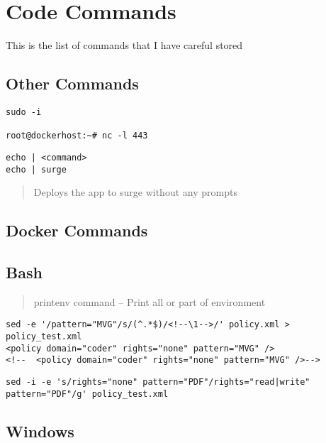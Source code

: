 \section{Code Commands}\label{code-commands}

This is the list of commands that I have careful stored

\subsection{Other Commands}\label{other-commands}

\begin{verbatim}
sudo -i

root@dockerhost:~# nc -l 443
\end{verbatim}

\begin{verbatim}
echo | <command>
echo | surge
\end{verbatim}

\begin{quote}
Deploys the app to surge without any prompts
\end{quote}

\hypertarget{docker-commands}{%
\subsection{Docker Commands}\label{docker-commands}}

\hypertarget{bash}{%
\subsection{Bash}\label{bash}}

\begin{quote}
printenv command -- Print all or part of environment
\end{quote}

\begin{verbatim}
sed -e '/pattern="MVG"/s/(^.*$)/<!--\1-->/' policy.xml > policy_test.xml
<policy domain="coder" rights="none" pattern="MVG" />
<!--  <policy domain="coder" rights="none" pattern="MVG" />-->
\end{verbatim}

\begin{verbatim}
sed -i -e 's/rights="none" pattern="PDF"/rights="read|write" pattern="PDF"/g' policy_test.xml
\end{verbatim}

\subsection{Windows}\label{windows}

